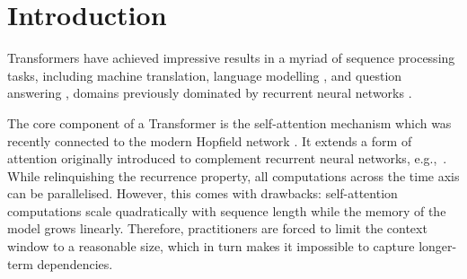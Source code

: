 \documentclass{article}
\theoremstyle{definition}
\begin{document}
\begin{abstract}
We show the formal equivalence of linearised self-attention mechanisms and fast weight controllers from the early '90s, where a ``slow" neural net learns by gradient descent to program the ``fast weights" of another net through sequences of elementary programming instructions which are additive outer products of self-invented activation patterns (today called keys and values).
Such Fast Weight Programmers (FWPs) learn to manipulate the contents of a finite memory and dynamically interact with it.
We infer a memory capacity limitation of
recent linearised softmax attention variants,
and replace the purely additive outer products by a delta rule-like programming instruction, such that the FWP can more easily learn to correct the current mapping from keys to values. The FWP also learns to compute dynamically changing learning rates.
We also propose a new kernel function to linearise attention
which balances simplicity and effectiveness.
We conduct experiments on synthetic
retrieval problems as well as standard machine translation
and language modelling tasks which demonstrate the benefits of our methods.
\end{abstract}

\section{Introduction}
\label{sec:intro}
Transformers \citep{trafo} have achieved impressive results in a myriad of sequence processing tasks,
including machine translation, language modelling \citep{al2018character, dai2019transformerxlacl, baevski2018adaptive, gpt2}, and question answering \cite{devlin2019bert},
domains previously dominated by recurrent neural networks \citep{graves2013generating, bahdanau2014neural}.

The core component of a Transformer is the self-attention mechanism \citep{cheng16, ParikhT0U16, lin2017structured}
which was recently connected to the modern Hopfield network \citep{ramsauer2021hopfield, KrotovH16, demircigil2017model}.
It extends a form of attention \citep{bahdanau2014neural} 
originally introduced to complement recurrent neural networks, e.g.,~\citep{hochreiter1997long}. 
While relinquishing the recurrence property, all computations across the time axis
can be parallelised.
However, this comes with drawbacks:
self-attention computations scale quadratically with sequence length
while the memory of the model grows linearly.
Therefore, practitioners are forced to limit the context window to a reasonable size,
which in turn makes it impossible to capture longer-term dependencies.
\end{document}
